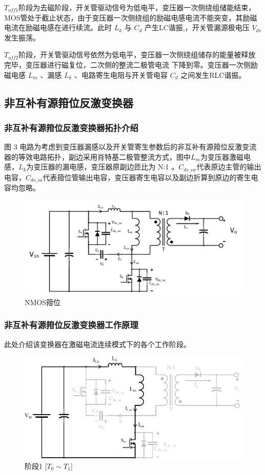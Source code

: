 \documentclass[UTF8]{ctexart}
\numberwithin{equation}{section}
\begin{document}
	$T_{off1}$阶段为去磁阶段，开关管驱动信号为低电平，变压器一次侧绕组储能结束，MOS管处于截止状态，由于变压器一次侧绕组的励磁电感电流不能突变，其励磁电流在励磁电感在进行续流。此时 $L_k$ 与 $C_d$ 产生LC谐振,，开关管漏源极电压 $V_{ds}$ 发生振荡。
	
	$T_{off2}$阶段，开关管驱动信号依然为低电平，变压器一次侧绕组储存的能量被释放完毕，变压器进行磁复位，二次侧的整流二极管电流  下降到零。变压器一次侧励磁电感 $L_m$ 、漏感 $L_k$ 、电路寄生电阻与开关管电容 $C_d$ 之间发生RLC谐振。
	
	
	\subsection{非互补有源箝位反激变换器}
	\subsubsection{非互补有源箝位反激变换器拓扑介绍}	
	图 3 电路为考虑到变压器漏感以及开关管寄生参数后的非互补有源箝位反激变流器的等效电路拓扑，副边采用肖特基二极管整流方式，图中$L_m$为变压器激磁电感，$L_k$为变压器的漏电感，变压器原副边匝比为 N:1 。$C_{ds\_sw}$代表原边主管的输出电容，$C_{ds\_sa}$代表箝位管输出电容，变压器寄生电容以及副边折算到原边的寄生电容均忽略。
	
	\begin{figure}[h]
		\centering
		\includegraphics[scale=0.48]{image/NMOS_Clamp.pdf}
		\caption{NMOS箝位}
	\end{figure}

	\subsubsection{非互补有源箝位反激变换器工作原理}
	此处介绍该变换器在激磁电流连续模式下的各个工作阶段。
	
	\begin{figure}[h]
		\centering
		\includegraphics[scale=0.5]{image/mo1.pdf}
		\caption{阶段1 [$T_0 \sim T_1$]}
	\end{figure}
	
\end{document}
